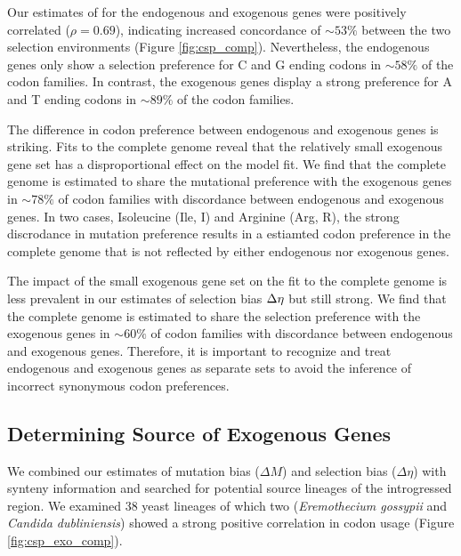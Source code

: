 \documentclass[12pt]{article}
\begin{document}
Our estimates of \DE for the endogenous and exogenous genes were positively correlated ($\rho = 0.69$), indicating increased concordance of $\sim53\%$ between the two selection environments  (Figure \ref{fig:csp_comp}).
Nevertheless, the endogenous genes only show a selection preference for C and G ending codons in $\sim58\%$ of the codon families.
In contrast, the exogenous genes display a strong preference for A and T ending codons in $\sim89\%$ of the codon families.

The difference in codon preference between endogenous and exogenous genes is striking.
Fits to the complete \kluyveri genome reveal that the relatively small exogenous gene set has a disproportional effect on the model fit.
We find that the complete \kluyveri genome is estimated to share the mutational preference with the exogenous genes in $\sim78\%$ of codon families with discordance between endogenous and exogenous genes.
In two cases, Isoleucine (Ile, I) and Arginine (Arg, R), the strong discrodance in mutation preference results in a estiamted codon preference in the complete \kluyveri genome that is not reflected by either endogenous nor exogenous genes.

The impact of the small exogenous gene set on the fit to the complete \kluyveri genome is less prevalent in our estimates of selection bias ${\Delta \eta}$ but still strong.
We find that the complete \kluyveri genome is estimated to share the selection preference with the exogenous genes in $\sim60\%$ of codon families with discordance between endogenous and exogenous genes.
Therefore, it is important to recognize and treat endogenous and exogenous genes as separate sets to avoid the inference of incorrect synonymous codon preferences.

\subsection*{Determining Source of Exogenous Genes}

We combined our estimates of mutation bias ($\Delta M$) and selection bias ($\Delta \eta$) with synteny information and searched for potential source lineages of the introgressed region.
We examined 38 yeast lineages of which two (\emph{Eremothecium gossypii} and \emph{Candida dubliniensis}) showed a strong positive correlation in codon usage (Figure \ref{fig:csp_exo_comp}).
\end{document}
